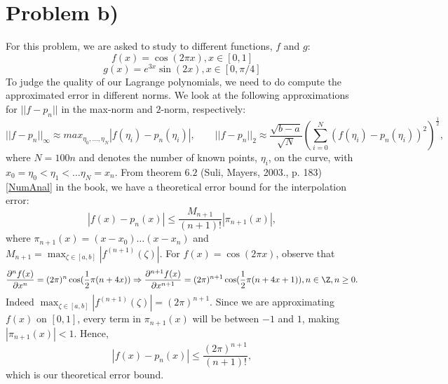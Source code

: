 \section{Problem b)}
For this problem, we are asked to study to different functions,  $f$ and $g$:
$$ f(x)=\cos(2\pi x), x\in[0,1]$$
$$ g(x)=e^{3x}\sin(2x), x\in [0, \pi/4]$$
To judge the quality of our Lagrange polynomials, we need to do compute the approximated error in different norms. We look at the following approximations for $||f-p_n||$ in the max-norm and $2$-norm, respectively:
$$ ||f-p_n||_{\infty} \approx max_{\eta_0, \dots, \eta_N}|f(\eta_i)-p_n(\eta_i)|, \qquad ||f-p_n||_{2}\approx \frac{\sqrt{b-a}}{\sqrt{N}}\left(\sum_{i=0}^{N}(f(\eta_i)-p_n(\eta_i))^2\right)^{\frac{1}{2}},$$
where $N=100n$ and denotes the number of known points, $\eta_i$, on the curve, with $x_0=\eta_0<\eta_1<\dots \eta_N=x_n$.
\newline From theorem $6.2$ (Suli, Mayers, 2003., p. 183)\ref{NumAnal} in the book, we have a theoretical error bound for the interpolation error:
$$ \left|f(x)-p_{n}(x)\right| \leq \frac{M_{n+1}}{(n+1) !}\left|\pi_{n+1}(x)\right| ,$$
where $\pi_{n+1}(x)=\left(x-x_{0}\right) \ldots\left(x-x_{n}\right)$ and $M_{n+1}=\max _{\zeta \in[a, b]}\left|f^{(n+1)}(\zeta)\right|$. For $f(x)=\cos(2\pi x)$, observe that
$$ \frac{\partial^n f(x)}{\partial x^n} = (2\pi)^n\cos(\frac{1}{2}\pi(n+4x)) \Rightarrow \frac{\partial^{n+1} f(x)}{\partial x^{n+1}} = (2\pi)^{n+1}\cos(\frac{1}{2}\pi(n+4x+1)), n\in \Z, n\geq 0.$$
Indeed $\max _{\zeta \in[a, b]}\left|f^{(n+1)}(\zeta)\right|=(2\pi)^{n+1}$. Since we are approximating $f(x)$ on $[0,1]$, every term in $\pi_{n+1}(x)$ will be between $-1$ and $1$, making $|\pi_{n+1}(x)|<1$. Hence,
$$ \left|f(x)-p_{n}(x)\right| \leq \frac{(2\pi)^{n+1}}{(n+1)!}, $$
which is our theoretical error bound.

